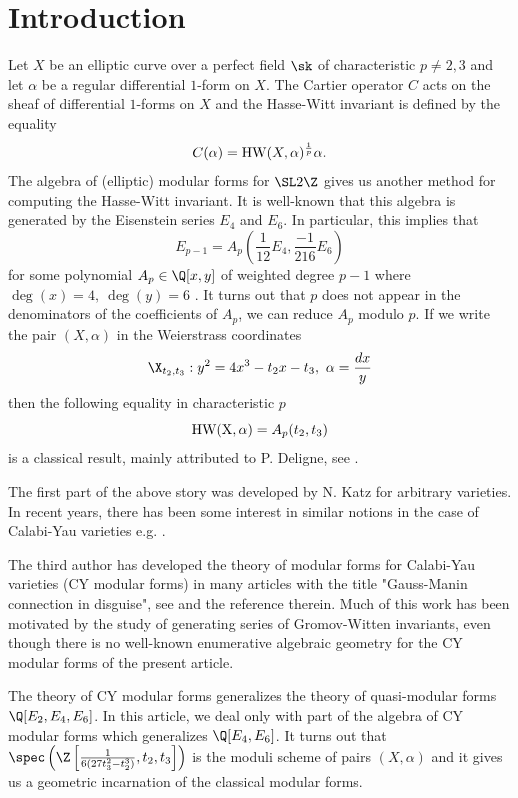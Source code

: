 \documentclass[11pt,leqno]{article}
\theoremstyle{remark}
\theoremstyle{definition}
\begin{document}
\section{Introduction}
Let $X$ be an elliptic curve over a perfect field $\sk$ of characteristic $p\not=2,3$ and let $\alpha$ be a regular differential $1$-form on $X$. The Cartier operator $C$ acts on the sheaf of differential $1$-forms on $X$ and the Hasse-Witt invariant is defined by the equality
$$
C(\alpha)={\rm HW}(X,\alpha)^{\frac{1}{p}}\alpha.
$$
The algebra of (elliptic) modular forms for $\SL 2\Z$ gives us another method for computing the Hasse-Witt invariant. It is well-known that this algebra is generated by the Eisenstein series $E_4$ and $E_6$. In particular, this implies that 
\begin{equation}
\label{19122025lastday}
E_{p-1}=A_p\left(\frac{1}{12}E_4,\frac{-1}{216}E_6\right)
\end{equation}
for some polynomial $A_p\in\Q[x,y]$ of weighted degree $p-1$ where $\deg(x)=4,\ \deg(y)=6$ . It turns out that $p$ does not appear in the denominators of the coefficients of $A_p$, we can reduce $A_p$ modulo $p$. If we write the pair $(X,\alpha)$ in the Weierstrass coordinates 
 \begin{equation}
 \label{25112025alirezaakbari}
 \X_{t_2,t_3}: y^2=4x^3-t_2x-t_3,\ \alpha=\frac{dx}{y}
 \end{equation} 
 then the following equality in characteristic $p$
 $$
{\rm HW(X,\alpha)}= A_p(t_2,t_3)
 $$
 is a classical result, mainly attributed to P. Deligne, see \cite[page 90]{ka73}. %

The first part of the above story was developed by N. Katz for arbitrary varieties. In recent years, there has been some interest in similar notions in the case of Calabi-Yau varieties e.g. \cite{Ogus2001}. 

The third author has developed the theory of modular forms for Calabi-Yau varieties (CY modular forms) in many articles with the title "Gauss-Manin connection in disguise", see \cite{ho2020, GMCD-MQCY3} and the reference therein. Much of this work has been motivated by the study of generating series of Gromov-Witten invariants, even though there is no well-known enumerative algebraic geometry for the CY modular forms of the present article. 

The theory of CY modular forms generalizes the theory of quasi-modular forms $\Q[E_2,E_4,E_6]$. In this article, we deal only with part of the algebra of CY modular forms which generalizes $\Q[E_4,E_6]$.  It turns out that $\spec\left(\Z\left[\frac{1}{6(27t_3^2-t_2^3)}, t_2,t_3\right]\right)$ is the moduli scheme of pairs $(X,\alpha)$  and it gives us a geometric incarnation of the classical modular forms. 
\end{document}

